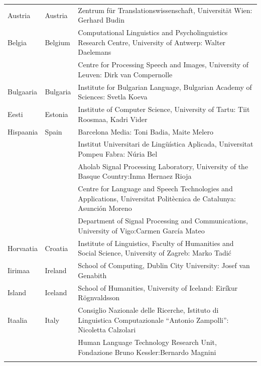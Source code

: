 \small
\begin{longtable}{@{}llp{113mm}@{}}
  Austria & \textcolor{grey1}{Austria} & Zentrum für Translationswissenschaft, Universität Wien: Gerhard Budin\\ \addlinespace 
  Belgia & \textcolor{grey1}{Belgium} & Computational Linguistics and Psycholinguistics Research Centre, University of Antwerp: Walter Daelemans\\ \addlinespace
  & & Centre for Processing Speech and Images, University of Leuven: Dirk van Compernolle \\ \addlinespace
  Bulgaaria & \textcolor{grey1}{Bulgaria} & Institute for Bulgarian Language, Bulgarian Academy of Sciences: Svetla Koeva \\ \addlinespace
  Eesti & \textcolor{grey1}{Estonia} & Institute of Computer Science, University of Tartu: Tiit Roosmaa, Kadri Vider\\ \addlinespace
  Hispaania & \textcolor{grey1}{Spain} & Barcelona Media: Toni Badia, Maite Melero \\ \addlinespace 
  & & Institut Universitari de Lingüística Aplicada, Universitat Pompeu Fabra: Núria Bel \\ \addlinespace 
  & & Aholab Signal Processing Laboratory, University of the Basque Country:\newline Inma Hernaez Rioja \\ \addlinespace 
  & & Centre for Language and Speech Technologies and Applications, Universitat Politècnica de Catalunya:  Asunción Moreno \\ \addlinespace 
  & & Department of Signal Processing and Communications, University of Vigo:\newline Carmen García Mateo \\ \addlinespace 
  Horvaatia & \textcolor{grey1}{Croatia} & Institute of Linguistics, Faculty of Humanities and Social Science, University of Zagreb: Marko Tadić \\ \addlinespace
  Iirimaa & \textcolor{grey1}{Ireland} & School of Computing, Dublin City University: Josef van Genabith\\ \addlinespace
  Island & \textcolor{grey1}{Iceland} & School of Humanities, University of Iceland: Eiríkur Rögnvaldsson\\ \addlinespace
  Itaalia & \textcolor{grey1}{Italy} & Consiglio Nazionale delle Ricerche, Istituto di Linguistica Computazionale “Antonio Zampolli”: Nicoletta Calzolari\\ \addlinespace
  & & Human Language Technology Research Unit, Fondazione Bruno Kessler:\newline Bernardo Magnini\\ \addlinespace 

\end{longtable}
